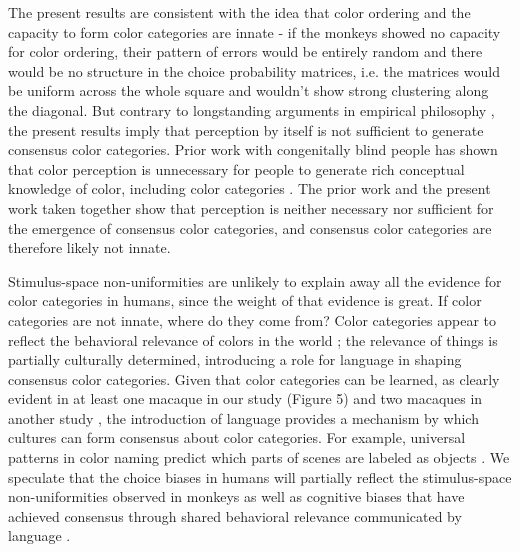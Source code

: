 \documentclass[9pt,biorxiv,lineno,onehalfspacing]{lapreprint}
\begin{document}
\begin{refsection}
The present results are consistent with the idea that color ordering and the capacity to form color categories are innate - if the monkeys showed no capacity for color ordering, their pattern of errors would be entirely random and there would be no structure in the choice probability matrices, i.e. the matrices would be uniform across the whole square and wouldn't show strong clustering along the diagonal. 
But contrary to longstanding arguments in empirical philosophy \citep{RN18743}, the present results imply that perception by itself is not sufficient to generate consensus color categories. Prior work with congenitally blind people has shown that color perception is unnecessary for people to generate rich conceptual knowledge of color, including color categories \citep{kim_shared_2021}. The prior work and the present work taken together show that perception is neither necessary nor sufficient for the emergence of consensus color categories, and consensus color categories are therefore likely not innate. 

Stimulus-space non-uniformities are unlikely to explain away all the evidence for color categories in humans, since the weight of that evidence is great. If color categories are not innate, where do they come from? Color categories appear to reflect the behavioral relevance of colors in the world \citep{RN18616,gibson_color_2017}; the relevance of things is partially culturally determined, introducing a role for language in shaping consensus color categories. Given that color categories can be learned, as clearly evident in at least one macaque in our study (Figure 5) and two macaques in another study \citep{panichello_error-correcting_2019}, the introduction of language provides a mechanism by which cultures can form consensus about color categories. For example, universal patterns in color naming predict which parts of scenes are labeled as objects \citep{gibson_color_2017}. We speculate that the choice biases in humans will partially reflect the stimulus-space non-uniformities observed in monkeys as well as cognitive biases that have achieved consensus through shared behavioral relevance communicated by language \citep{RN18511,RN18514,RN18602}. 


\printbibliography[title=Main Text References]
\end{refsection}

\if@endfloat\clearpage\processdelayedfloats\clearpage\fi 
\end{document}
